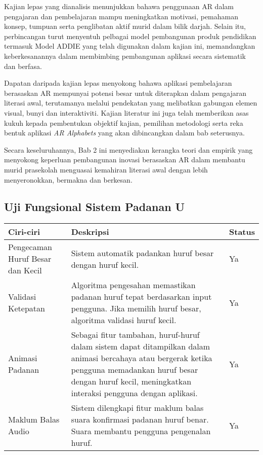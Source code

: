 \begin{itemize}
\begin{itemize}
\begin{itemize}
\begin{itemize}
\begin{itemize}
\begin{itemize}
\begin{itemize}
\begin{itemize}
\begin{flushleft}
Kajian lepas yang dianalisis menunjukkan bahawa penggunaan AR dalam pengajaran dan pembelajaran mampu meningkatkan motivasi, pemahaman konsep, tumpuan serta penglibatan aktif murid dalam bilik darjah. Selain itu, perbincangan turut menyentuh pelbagai model pembangunan produk pendidikan termasuk Model ADDIE yang telah digunakan dalam kajian ini, memandangkan keberkesanannya dalam membimbing pembangunan aplikasi secara sistematik dan berfasa.

Dapatan daripada kajian lepas menyokong bahawa aplikasi pembelajaran berasaskan AR mempunyai potensi besar untuk diterapkan dalam pengajaran literasi awal, terutamanya melalui pendekatan yang melibatkan gabungan elemen visual, bunyi dan interaktiviti. Kajian literatur ini juga telah memberikan asas kukuh kepada pembentukan objektif kajian, pemilihan metodologi serta reka bentuk aplikasi \textit{AR Alphabets} yang akan dibincangkan dalam bab seterusnya.

Secara keseluruhannya, Bab 2 ini menyediakan kerangka teori dan empirik yang menyokong keperluan pembangunan inovasi berasaskan AR dalam membantu murid prasekolah menguasai kemahiran literasi awal dengan lebih menyeronokkan, bermakna dan berkesan.

\subsection{Uji Fungsional  Sistem Padanan U}

\begin{tabular}{>{\raggedright}p{3cm}>{\raggedright}p{8cm}>{\raggedright\arraybackslash}p{2cm}}
\toprule
\textbf{Ciri-ciri} & \textbf{Deskripsi} & \textbf{Status} \\
\midrule
Pengecaman Huruf Besar dan Kecil & Sistem automatik padankan huruf besar dengan huruf kecil. & Ya \\

Validasi Ketepatan & Algoritma pengesahan memastikan padanan huruf tepat berdasarkan input pengguna. Jika memilih huruf besar, algoritma validasi huruf kecil. & Ya \\

Animasi Padanan & Sebagai fitur tambahan, huruf-huruf dalam sistem dapat ditampilkan dalam animasi bercahaya atau bergerak ketika pengguna memadankan huruf besar dengan huruf kecil, meningkatkan interaksi pengguna dengan aplikasi. & Ya \\

Maklum Balas Audio & Sistem dilengkapi fitur maklum balas suara konfirmasi padanan huruf benar. Suara membantu pengguna pengenalan huruf. & Ya \\


\end{tabular}
\end{flushleft}
\end{itemize}
\end{itemize}
\end{itemize}
\end{itemize}
\end{itemize}
\end{itemize}
\end{itemize}
\end{itemize}
